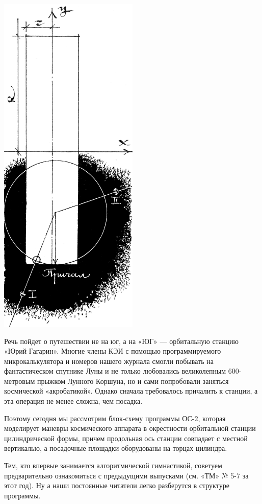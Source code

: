\documentclass[11pt,a4paper,oneside]{article}
\begin{document}
\includegraphics[width=0.5\textwidth]{jump_to_ug3}

Речь пойдет о путешествии не на юг, а на «ЮГ» — орбитальную станцию «Юрий Гагарин». Многие члены КЭИ с помощью программируемого микрокалькулятора и номеров нашего журнала смогли побывать на фантастическом спутнике Луны и не только любовались великолепным 600-метровым прыжком Лунного Коршуна, но и сами попробовали заняться космической «акробатикой». Однако сначала требовалось причалить к станции, а эта операция не менее сложна, чем посадка.

Поэтому сегодня мы рассмотрим блок-схему программы ОС-2, которая моделирует маневры космического аппарата в окрестности орбитальной станции цилиндрической формы, причем продольная ось станции совпадает с местной вертикалью, а посадочные площадки оборудованы на торцах цилиндра.

Тем, кто впервые занимается алгоритмической гимнастикой, советуем предварительно ознакомиться с предыдущими выпусками (см. «ТМ» № 5-7 за этот год). Ну а наши постоянные читатели легко разберутся в структуре программы.
\end{document}
